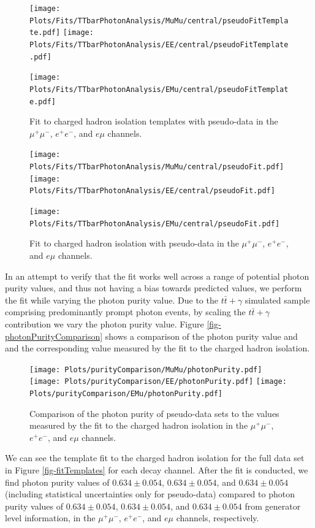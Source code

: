 \begin{figure}
\texttt{[image: Plots/Fits/TTbarPhotonAnalysis/MuMu/central/pseudoFitTemplate.pdf]}
\texttt{[image: Plots/Fits/TTbarPhotonAnalysis/EE/central/pseudoFitTemplate.pdf]}\\
\begin{center}
\texttt{[image: Plots/Fits/TTbarPhotonAnalysis/EMu/central/pseudoFitTemplate.pdf]}
\end{center}
\caption{Fit to charged hadron isolation templates with pseudo-data in the $\mu^{+}\mu^{-}$, $e^{+}e^{-}$, and $e\mu$ channels.}
\label{fig-pseudofitTemplates}
\end{figure}

\begin{figure}
\texttt{[image: Plots/Fits/TTbarPhotonAnalysis/MuMu/central/pseudoFit.pdf]}
\texttt{[image: Plots/Fits/TTbarPhotonAnalysis/EE/central/pseudoFit.pdf]}\\
\begin{center}
\texttt{[image: Plots/Fits/TTbarPhotonAnalysis/EMu/central/pseudoFit.pdf]}
\end{center}
\caption{Fit to charged hadron isolation with pseudo-data in the $\mu^{+}\mu^{-}$, $e^{+}e^{-}$, and $e\mu$ channels.}
\label{fig-pseudofit}
\end{figure}

In an attempt to verify that the fit works well across a range of potential photon purity values, and thus not having a bias towards predicted values, we perform the fit while varying the photon purity value. Due to the $t\bar{t}+\gamma$ simulated sample comprising predominantly prompt photon events, by scaling the $t\bar{t}+\gamma$ contribution we vary the photon purity value. Figure \ref{fig-photonPurityComparison} shows a comparison of the photon purity value and and the corresponding value measured by the fit to the charged hadron isolation. 


\begin{figure}
\texttt{[image: Plots/purityComparison/MuMu/photonPurity.pdf]}
\texttt{[image: Plots/purityComparison/EE/photonPurity.pdf]}
\texttt{[image: Plots/purityComparison/EMu/photonPurity.pdf]}
\caption{Comparison of the photon purity of pseudo-data sets to the values measured by the fit to the charged hadron isolation in the $\mu^{+}\mu^{-}$, $e^{+}e^{-}$, and $e\mu$ channels.}
\label{fig-photonPuritiyComparison}
\end{figure}

We can see the template fit to the charged hadron isolation for the full data set in Figure \ref{fig-fitTemplates} for each decay channel. After the fit is conducted, we find photon purity values of $0.634 \pm 0.054$, $0.634 \pm 0.054$, and $0.634 \pm 0.054$ (including statistical uncertainties only for pseudo-data) compared to photon purity values of $0.634 \pm 0.054$, $0.634 \pm 0.054$, and $0.634 \pm 0.054$ from generator level information, in the $\mu^{+}\mu^{-}$, $e^{+}e^{-}$, and $e\mu$ channels, respectively. 

